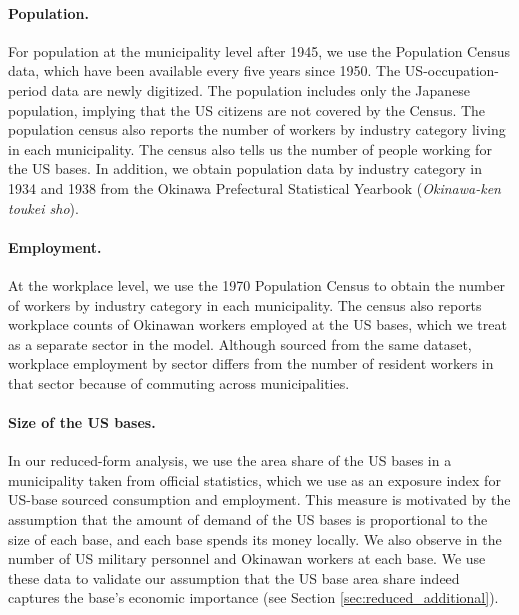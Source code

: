 \documentclass[12pt, unicode, a4paper]{article}
\newcommand{\1}{\mbox{1}\hspace{-0.25em}\mbox{l}} %
\begin{document}
\paragraph{Population.}

For population at the municipality level after 1945, we use the Population Census data, which have been available every five years since 1950. The US-occupation-period data are newly digitized.
The population includes only the Japanese population, implying that the US citizens are not covered by the Census. 
The population census also reports the number of workers by industry category living in each municipality.
The census also tells us the number of people working for the US bases.
In addition, we obtain population data by industry category in 1934 and 1938 from the Okinawa Prefectural Statistical Yearbook (\textit{Okinawa-ken toukei sho}).

\paragraph{Employment.} At the workplace level, we use the 1970 Population Census to obtain the number of workers by industry category in each municipality. 
The census also reports workplace counts of Okinawan workers employed at the US bases, which we treat as a separate sector in the model.
Although sourced from the same dataset, workplace employment by sector differs from the number of resident workers in that sector because of commuting across municipalities.

\paragraph{Size of the US bases.}

In our reduced-form analysis, we use the area share of the US bases in a municipality taken from official statistics, which we use as an exposure index for US-base sourced consumption and employment.
This measure is motivated by the assumption that the amount of demand of the US bases is proportional to the size of each base, and each base spends its money locally. 
We also observe in \cite{Komeito69} the number of US military personnel and Okinawan workers at each base. We use these data to validate our assumption that the US base area share indeed captures the base's  economic importance (see Section \ref{sec:reduced_additional}).
\end{document}

